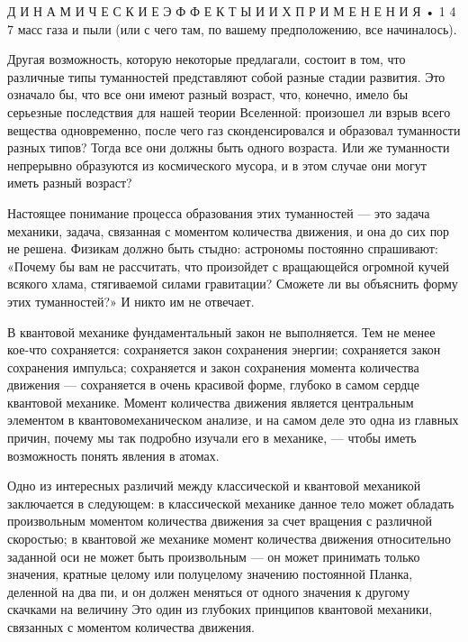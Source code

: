 \documentclass[10pt,oneside]{article}
\newcommand{\TipsSubsection}[1]{\par\vspace{6bp}{\normalsize\bfseries #1\par}\vspace{2bp}}
\begin{document}
Д И Н А М И Ч Е С К И Е  Э Ф Ф Е К Т Ы  И  И Х  П Р И М Е Н Е Н И Я • 1 4 7 масс газа и пыли (или с чего там, по вашему предположению, все начиналось).\par

Другая возможность, которую некоторые предлагали, состоит в том, что различные типы туманностей представляют собой разные стадии развития. Это означало бы, что все они имеют разный возраст, что, конечно, имело бы серьезные последствия для нашей теории Вселенной: произошел ли взрыв всего вещества одновременно, после чего газ сконденсировался и образовал туманности разных типов? Тогда все они должны быть одного возраста. Или же туманности непрерывно образуются из космического мусора, и в этом случае они могут иметь разный возраст?\par

Настоящее понимание процесса образования этих туманностей --- это задача механики, задача, связанная с моментом количества движения, и она до сих пор не решена. Физикам должно быть стыдно: астрономы постоянно спрашивают: «Почему бы вам не рассчитать, что произойдет с вращающейся огромной кучей всякого хлама, стягиваемой силами гравитации? Сможете ли вы объяснить форму этих туманностей?» И никто им не отвечает.\par

\TipsSubsection{4-13 Момент количества движения в квантовой механике}

В квантовой механике фундаментальный закон не выполняется. Тем не менее кое-что сохраняется: сохраняется закон сохранения энергии; сохраняется закон сохранения импульса; сохраняется и закон сохранения момента количества движения --- сохраняется в очень красивой форме, глубоко в самом сердце квантовой механике. Момент количества движения является центральным элементом в квантовомеханическом анализе, и на самом деле это одна из главных причин, почему мы так подробно изучали его в механике, --- чтобы иметь возможность понять явления в атомах.\par

Одно из интересных различий между классической и квантовой механикой заключается в следующем: в классической механике данное тело может обладать произвольным моментом количества движения за счет вращения с различной скоростью; в квантовой же механике момент количества движения относительно заданной оси не может быть произвольным --- он может принимать только значения, кратные целому или полуцелому значению постоянной Планка, деленной на два пи, и он должен меняться от одного значения к другому скачками на величину Это один из глубоких принципов квантовой механики, связанных с моментом количества движения.\par
\end{document}
